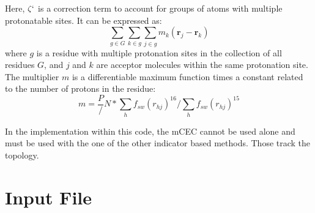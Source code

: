 \documentclass{article}
\begin{document}
Here, $\zeta`$ is a correction term to account for groups of atoms with multiple protonatable sites. It can be expressed as:
\begin{equation}
\sum_{g \in G} \sum_{k\in g}\sum_{j \in g}m_k (\mathbf{r}_j - \mathbf{r}_k)
\end{equation}
where $g$ is a residue with multiple protonation sites in the collection of all residues $G$, and $j$ and $k$ are acceptor molecules within the same protonation site. 
The multiplier $m$ is a differentiable maximum function times a constant related to the number of protons in the residue:
\begin{equation}
m = \frac{P}/{N} * \sum_h f_{sw}(r_{hj})^{16} / \sum_h f_{sw}(r_{hj})^{15}
\end{equation}

In the implementation within this code, the mCEC cannot be used alone and must be used with the one of the other indicator based methods. Those track the topology.


\section{Input File}
\end{document}
